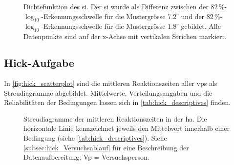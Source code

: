 \documentclass[11pt, twoside, a4paper]{book}		%
\begin{document}
\begin{figure}[htbp]
	\centering
	\begin{adjustbox}{width=1\textwidth}
		
	\end{adjustbox}
	\caption[Dichtefunktion des \gls{si}]{Dichtefunktion des \gls{si}. Der \gls{si} wurde als Differenz zwischen der $82\,\%$-$\log_{10}$-Er\-ken\-nungs\-schwel\-le für die Mustergrösse $7.2^{\circ}$ und der $82\,\%$-$\log_{10}$-Er\-ken\-nungs\-schwel\-le für die Mustergrösse $1.8^{\circ}$ gebildet. Alle Datenpunkte sind auf der x-Achse mit vertikalen Strichen markiert.}
	\label{fig:suppression_index_density}
\end{figure}

\subsection{Hick-Aufgabe}

In \autoref{fig:hick_scatterplot} sind die mittleren Reaktionszeiten aller \glspl{vp} als Streudiagramme abgebildet.
Mittelwerte, Verteilungsangaben und die Reliabilitäten der Bedingungen lassen sich in \autoref{tab:hick_descriptives} finden. 

\begin{figure}[p]
	\centering
	\begin{adjustbox}{width=1\textwidth}
		
	\end{adjustbox}
	\caption[Streudiagramme der Reaktionszeiten in der \gls{ha}]{Streudiagramme der mittleren Reaktionszeiten in der \gls{ha}. Die horizontale Linie kennzeichnet jeweils den Mittelwert innerhalb einer Bedingung (siehe \autoref{tab:hick_descriptives}). Siehe \autoref{subsec:hick_Versuchsablauf} für eine Beschreibung der Datenaufbereitung. Vp = Versuchsperson.}
	\label{fig:hick_scatterplot}
\end{figure}
\end{document}
